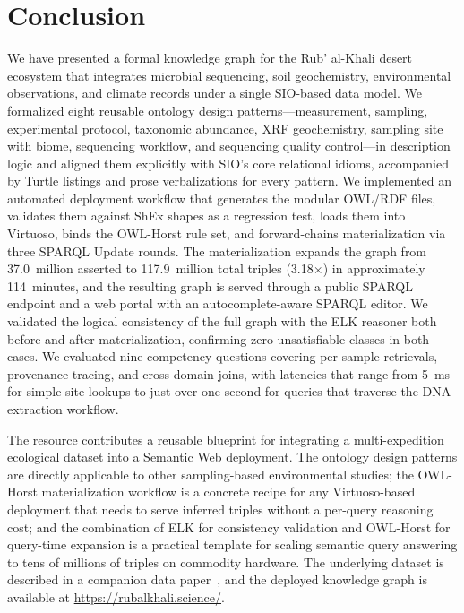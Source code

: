 \documentclass[11pt,a4paper]{article}
\begin{document}
\section{Conclusion}\label{sec:conclusion}

We have presented a formal knowledge graph for the Rub' al-Khali
desert ecosystem that integrates microbial sequencing, soil
geochemistry, environmental observations, and climate records under
a single SIO-based data model. We formalized eight reusable ontology
design patterns---measurement, sampling, experimental protocol,
taxonomic abundance, XRF geochemistry, sampling site with biome,
sequencing workflow, and sequencing quality control---in description
logic and aligned them explicitly with SIO's core relational idioms,
accompanied by Turtle listings and prose verbalizations for every
pattern. We implemented an automated deployment workflow that
generates the modular OWL/RDF files, validates them against ShEx
shapes as a regression test, loads them into Virtuoso, binds the
OWL-Horst rule set, and forward-chains materialization via three
SPARQL Update rounds. The materialization expands the graph from
37.0~million asserted to 117.9~million total triples
(3.18$\times$) in approximately 114~minutes, and the resulting
graph is served through a public SPARQL endpoint and a web portal
with an autocomplete-aware SPARQL editor. We validated the logical
consistency of the full graph with the ELK reasoner both before and
after materialization, confirming zero unsatisfiable classes in both
cases. We evaluated nine competency questions covering per-sample
retrievals, provenance tracing, and cross-domain joins, with
latencies that range from 5~ms for simple site lookups to just over
one second for queries that traverse the DNA extraction workflow.

The resource contributes a reusable blueprint for integrating a
multi-expedition ecological dataset into a Semantic Web
deployment. The ontology design patterns are directly applicable to
other sampling-based environmental studies; the OWL-Horst
materialization workflow is a concrete recipe for any Virtuoso-based
deployment that needs to serve inferred triples without a per-query
reasoning cost; and the combination of ELK for consistency
validation and OWL-Horst for query-time expansion is a practical
template for scaling semantic query answering to tens of millions
of triples on commodity hardware. The underlying dataset is
described in a companion data paper~\cite{gigascience_companion},
and the deployed knowledge graph is available at
\url{https://rubalkhali.science/}.
\end{document}
